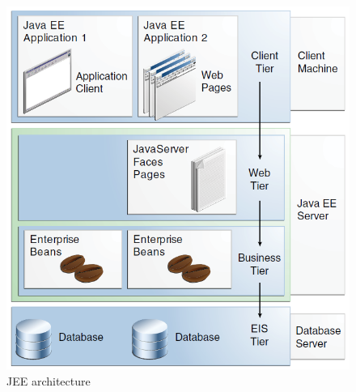 \begin{figure}[ph]
\centering
\includegraphics[width=\linewidth]{./images/jeearch}
\caption[jee arch]{JEE architecture}
\label{fig:jeearch}
\end{figure}